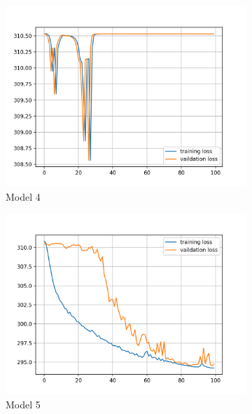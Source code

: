 \documentclass[a4paper,10pt]{article}
\begin{document}
\begin{figure}[htbp]
  \begin{subfigure}{0.3\textwidth}
    \includegraphics[width=\textwidth]{figures/assignment_3/segmentation_model4.png}
    \caption{Model 4}
    \label{fig:image1}
  \end{subfigure}
  \hfill
  \begin{subfigure}{0.3\textwidth}
    \includegraphics[width=\textwidth]{figures/assignment_3/segmentation_model5.png}
    \caption{Model 5}
    \label{fig:image2}
  \end{subfigure}
  \label{fig:both_images}
   \hfill
  \begin{subfigure}{0.3\textwidth}

\end{subfigure}
\end{figure}
\end{document}
